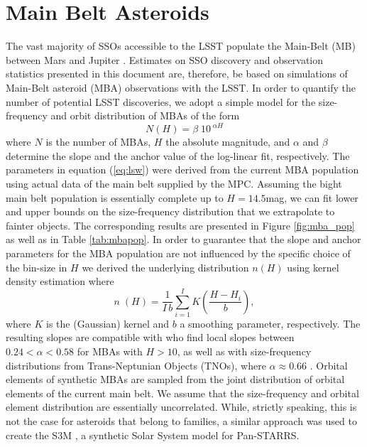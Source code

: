 \section{Main Belt Asteroids} \label{sec:mba}
The vast majority of SSOs accessible to the \gls{LSST} populate the Main-Belt (\gls{MB}) between Mars and Jupiter \citep{LSSTscibook2009}. Estimates on \gls{SSO} discovery and observation statistics presented in this document are, therefore, be based on simulations of Main-Belt asteroid (\gls{MBA}) observations with the \gls{LSST}. 
In order to quantify the number of potential \gls{LSST} discoveries, we adopt a simple model for the size-frequency and orbit distribution of MBAs of the form
\begin{equation}
 N(H)=\beta\;10^{\;\alpha H}
 \label{eq:lsw}
\end{equation}
where $N$ is the number of MBAs, $H$ the absolute magnitude, and $\alpha$ and $\beta$ determine the slope and the anchor value of the log-linear fit, respectively.
The parameters in equation (\ref{eq:lsw}) were derived from the current \gls{MBA} population using actual data of the main belt supplied by the \gls{MPC}. 
Assuming the bight main belt population is essentially complete up to $H=14.5$mag, we can fit lower and upper bounds on the size-frequency distribution that we extrapolate to fainter objects. The corresponding results are presented in Figure \ref{fig:mba_pop} as well as in Table \ref{tab:mbapop}.
In order to guarantee that the slope and anchor parameters for the \gls{MBA} population are not influenced by the specific choice of the bin-size in $H$ we derived the underlying distribution $n(H)$ using kernel density estimation where
\begin{equation}
 n\;(H)=\frac{1}{I\,b} \sum_{i=1}^{I} K\left(\frac{H-H_i}{b}\right),
 \label{eggl:eq:kernel}
\end{equation}
where $K$ is the (Gaussian) kernel and $b$ a smoothing parameter, respectively. The resulting slopes are compatible with \citet{jedicke2002} who find local slopes between $0.24<\alpha<0.58$ for MBAs with $H>10$, as well as with size-frequency distributions from Trans-Neptunian Objects (TNOs), where $\alpha\approx0.66$ \citep{bernstein2004}.
Orbital elements of synthetic MBAs are sampled from the joint distribution of orbital elements of the current main belt. We assume that the size-frequency and orbital element distribution are essentially uncorrelated. While, strictly speaking, this is not the case for asteroids that belong to families, a similar approach was used to create the S3M \citep{s3m}, a synthetic Solar System model for \gls{Pan-STARRS}.
